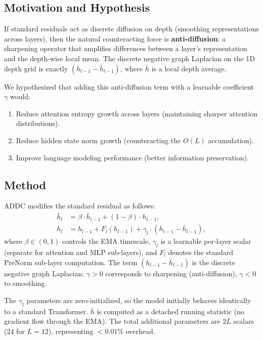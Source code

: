 \documentclass[10pt]{article}
\begin{document}
\subsection{Motivation and Hypothesis}

If standard residuals act as discrete diffusion on depth (smoothing representations across layers), then the natural counteracting force is \textbf{anti-diffusion}: a sharpening operator that amplifies differences between a layer's representation and the depth-wise local mean. The discrete negative graph Laplacian on the 1D depth grid is exactly $(h_{l-1} - \bar{h}_{l-1})$, where $\bar{h}$ is a local depth average.

We hypothesized that adding this anti-diffusion term with a learnable coefficient $\gamma$ would:
\begin{enumerate}[leftmargin=*,itemsep=2pt]
    \item Reduce attention entropy growth across layers (maintaining sharper attention distributions).
    \item Reduce hidden state norm growth (counteracting the $O(L)$ accumulation).
    \item Improve language modeling performance (better information preservation).
\end{enumerate}

\subsection{Method}

ADDC modifies the standard residual as follows:
\begin{align}
    \bar{h}_l &= \beta \cdot \bar{h}_{l-1} + (1-\beta) \cdot h_{l-1}, \label{eq:addc_ema} \\
    h_l &= h_{l-1} + F_l(h_{l-1}) + \gamma_l \cdot (h_{l-1} - \bar{h}_{l-1}), \label{eq:addc_residual}
\end{align}
where $\beta \in (0,1)$ controls the EMA timescale, $\gamma_l$ is a learnable per-layer scalar (separate for attention and MLP sub-layers), and $F_l$ denotes the standard PreNorm sub-layer computation. The term $(h_{l-1} - \bar{h}_{l-1})$ is the discrete negative graph Laplacian: $\gamma > 0$ corresponds to sharpening (anti-diffusion), $\gamma < 0$ to smoothing.

The $\gamma_l$ parameters are zero-initialized, so the model initially behaves identically to a standard Transformer. $\bar{h}$ is computed as a detached running statistic (no gradient flow through the EMA). The total additional parameters are $2L$ scalars (24 for $L=12$), representing $<0.01\%$ overhead.
\end{document}
